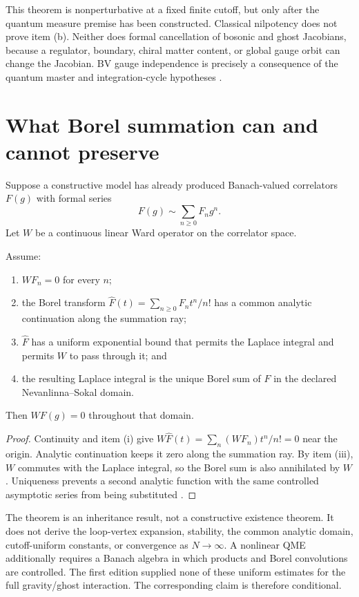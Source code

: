\documentclass[11pt]{article}
\begin{document}
This theorem is nonperturbative at a fixed finite cutoff, but only after the
quantum measure premise has been constructed.  Classical nilpotency does not
prove item (b).  Neither does formal cancellation of bosonic and ghost
Jacobians, because a regulator, boundary, chiral matter content, or global
gauge orbit can change the Jacobian.  BV gauge independence is precisely a
consequence of the quantum master and integration-cycle hypotheses
\cite{Schwarz1993,Costello2007}.

\section{What Borel summation can and cannot preserve}

Suppose a constructive model has already produced Banach-valued correlators
$F(g)$ with formal series
\[
 F(g)\sim\sum_{n\ge0}F_ng^n.
\]
Let $W$ be a continuous linear Ward operator on the correlator space.

\begin{theorem}
Assume:
\begin{enumerate}[label=\textup{(\roman*)}]
\item $WF_n=0$ for every $n$;
\item the Borel transform
$\widehat F(t)=\sum_{n\ge0}F_nt^n/n!$ has a common analytic continuation along
the summation ray;
\item $\widehat F$ has a uniform exponential bound that permits the Laplace
integral and permits $W$ to pass through it; and
\item the resulting Laplace integral is the unique Borel sum of $F$ in the
declared Nevanlinna--Sokal domain.
\end{enumerate}
Then $WF(g)=0$ throughout that domain.
\end{theorem}

\begin{proof}
Continuity and item (i) give
$W\widehat F(t)=\sum_n(WF_n)t^n/n!=0$ near the origin.  Analytic continuation
keeps it zero along the summation ray.  By item (iii), $W$ commutes with the
Laplace integral, so the Borel sum is also annihilated by $W$.  Uniqueness
prevents a second analytic function with the same controlled asymptotic series
from being substituted \cite{Sokal1980}.
\end{proof}

The theorem is an inheritance result, not a constructive existence theorem.
It does not derive the loop-vertex expansion, stability, the common analytic
domain, cutoff-uniform constants, or convergence as $N\to\infty$.  A nonlinear
QME additionally requires a Banach algebra in which products and Borel
convolutions are controlled.  The first edition supplied none of these uniform
estimates for the full gravity/ghost interaction.  The corresponding claim is
therefore conditional.
\end{document}
